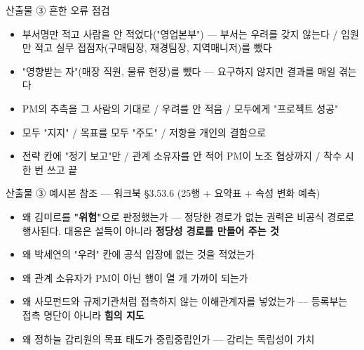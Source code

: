 \begin{frame}{산출물 ③ 흔한 오류 점검}
\begin{itemize}
\item 부서명만 적고 사람을 안 적었다("영업본부") — 부서는 우려를 갖지 않는다 / 임원만 적고 실무 접점자(구매팀장, 재경팀장, 지역매니저)를 뺐다
\item "영향받는 자"(매장 직원, 물류 현장)를 뺐다 — 요구하지 않지만 결과를 매일 겪는다
\item PM의 추측을 그 사람의 기대로 / 우려를 안 적음 / 모두에게 "프로젝트 성공"
\item 모두 "지지" / 목표를 모두 "주도" / 저항을 개인의 결함으로
\item 전략 칸에 "정기 보고"만 / 관계 소유자를 안 적어 PM이 노조 협상까지 / 착수 시 한 번 쓰고 끝
\end{itemize}
\end{frame}

\begin{frame}{산출물 ③ 예시본 참조 — 워크북 §3.5\til{}3.6 (25행 + 요약표 + 속성 변화 예측)}
\begin{itemize}
\item 왜 김미르를 \textbf{"위험"}으로 판정했는가 — 정당한 경로가 없는 권력은 비공식 경로로 행사된다. 대응은 설득이 아니라 \textbf{정당성 경로를 만들어 주는 것}
\item 왜 박세연의 "우려" 칸에 공식 입장에 없는 것을 적었는가
\item 왜 관계 소유자가 PM이 아닌 행이 열 개 가까이 되는가
\item 왜 사모펀드와 규제기관처럼 접촉하지 않는 이해관계자를 넣었는가 — 등록부는 접촉 명단이 아니라 \textbf{힘의 지도}
\item 왜 정하늘 감리원의 목표 태도가 중립\ra{}중립인가 — 감리는 독립성이 가치
\end{itemize}
\end{frame}

